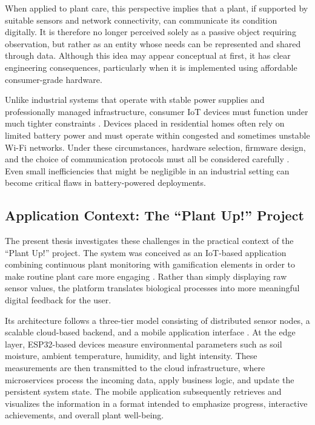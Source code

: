 When applied to plant care, this perspective implies that a plant, if supported by suitable sensors and network connectivity, can communicate its condition digitally. It is therefore no longer perceived solely as a passive object requiring observation, but rather as an entity whose needs can be represented and shared through data. Although this idea may appear conceptual at first, it has clear engineering consequences, particularly when it is implemented using affordable consumer-grade hardware.

Unlike industrial systems that operate with stable power supplies and professionally managed infrastructure, consumer IoT devices must function under much tighter constraints \cite{kaaiotChallenges}. Devices placed in residential homes often rely on limited battery power and must operate within congested and sometimes unstable Wi-Fi networks. Under these circumstances, hardware selection, firmware design, and the choice of communication protocols must all be considered carefully \cite{emnifyChallenges}. Even small inefficiencies that might be negligible in an industrial setting can become critical flaws in battery-powered deployments.

\subsection{Application Context: The ``Plant Up!'' Project}

The present thesis investigates these challenges in the practical context of the ``Plant Up!'' project. The system was conceived as an IoT-based application combining continuous plant monitoring with gamification elements in order to make routine plant care more engaging \cite{smarticoGamification}. Rather than simply displaying raw sensor values, the platform translates biological processes into more meaningful digital feedback for the user.

Its architecture follows a three-tier model consisting of distributed sensor nodes, a scalable cloud-based backend, and a mobile application interface \cite{cheThreeTier}. At the edge layer, ESP32-based devices measure environmental parameters such as soil moisture, ambient temperature, humidity, and light intensity. These measurements are then transmitted to the cloud infrastructure, where microservices process the incoming data, apply business logic, and update the persistent system state. The mobile application subsequently retrieves and visualizes the information in a format intended to emphasize progress, interactive achievements, and overall plant well-being.


